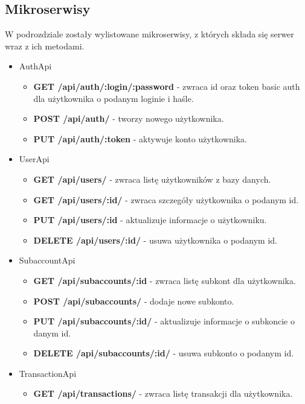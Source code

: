 \documentclass{article}
\begin{document}
	\subsection{Mikroserwisy}
	W podrozdziale zostały wylistowane mikroserwisy, z których składa się serwer wraz z ich
	metodami.
	\begin{itemize}
		\item AuthApi
			\begin{itemize}
				\item \textbf{GET /api/auth/:login/:password} - zwraca id oraz token basic auth dla użytkownika o podanym loginie i haśle.

				\item \textbf{POST /api/auth/} - tworzy nowego użytkownika.

				\item \textbf{PUT /api/auth/:token} - aktywuje konto użytkownika.
			\end{itemize}
		\item UserApi
			\begin{itemize}
				\item \textbf{GET /api/users/} - zwraca listę użytkowników z bazy danych.

				\item \textbf{GET /api/users/:id/} - zwraca szczegóły użytkownika o podanym id.

				\item \textbf{PUT /api/users/:id} - aktualizuje informacje o użytkowniku.

				\item \textbf{DELETE /api/users/:id/} - usuwa użytkownika o podanym id.

			\end{itemize}
		\item SubaccountApi
			\begin{itemize}
				\item \textbf{GET /api/subaccounts/:id} - zwraca listę subkont dla użytkownika.

				\item \textbf{POST /api/subaccounts/} - dodaje nowe subkonto.

				\item \textbf{PUT /api/subaccounts/:id/} - aktualizuje informacje o subkoncie o danym id.

				\item \textbf{DELETE /api/subaccounts/:id/} - usuwa subkonto o podanym id.
			\end{itemize}
		\item TransactionApi
			\begin{itemize}
				\item \textbf{GET /api/transactions/} - zwraca listę transakcji dla użytkownika.


\end{itemize}
\end{itemize}
\end{document}
